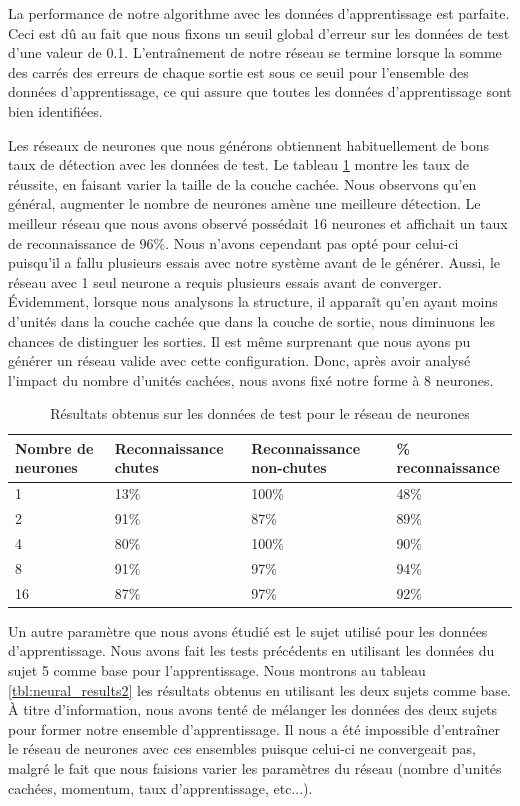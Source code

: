 \documentclass[12pt,letterpaper]{article}
\begin{document}
La performance de notre algorithme avec les données d'apprentissage est parfaite. Ceci est dû au fait que nous fixons un seuil global d'erreur sur les données de test d'une valeur de 0.1. L'entraînement de notre réseau se termine lorsque la somme des carrés des erreurs de chaque sortie est sous ce seuil pour l'ensemble des données d'apprentissage, ce qui assure que toutes les données d'apprentissage sont bien identifiées.

Les réseaux de neurones que nous générons obtiennent habituellement de bons taux de détection avec les données de test. Le tableau \ref{tbl:neural_results} montre les taux de réussite, en faisant varier la taille de la couche cachée. Nous observons qu'en général, augmenter le nombre de neurones amène une meilleure détection. Le meilleur réseau que nous avons observé possédait 16 neurones et affichait un taux de reconnaissance de 96\%. Nous n'avons cependant pas opté pour celui-ci puisqu'il a fallu plusieurs essais avec notre système avant de le générer. Aussi, le réseau avec 1 seul neurone a requis plusieurs essais avant de converger. Évidemment, lorsque nous analysons la structure, il apparaît qu'en ayant moins d'unités dans la couche cachée que dans la couche de sortie, nous diminuons les chances de distinguer les sorties. Il est même surprenant que nous ayons pu générer un réseau valide avec cette configuration. Donc, après avoir analysé l'impact du nombre d'unités cachées, nous avons fixé notre forme à 8 neurones.
\begin{table}
\centering
\begin{tabular}{|p{1.2in}|p{1.3in}|p{1.3in}|l|}
    \hline
    \bf{Nombre de neurones} & \bf{Reconnaissance chutes} & \bf{Reconnaissance non-chutes} & \bf{\% reconnaissance} \\ \hline
    1 & 13\% & 100\% & 48\%  \\ \hline
    2 & 91\%  & 87\% & 89\% \\ \hline
    4 & 80\% & 100\% & 90\% \\ \hline
    8 & 91\% & 97\% & 94\% \\ \hline
    16 & 87\% & 97\% & 92\% \\ \hline
\end{tabular}
\caption{Résultats obtenus sur les données de test pour le réseau de neurones}
\label{tbl:neural_results}
\end{table}

Un autre paramètre que nous avons étudié est le sujet utilisé pour les données d'apprentissage. Nous avons fait les tests précédents en utilisant les données du sujet 5 comme base pour l'apprentissage. Nous montrons au tableau \ref{tbl:neural_results2} les résultats obtenus en utilisant les deux sujets comme base. À titre d'information, nous avons tenté de mélanger les données des deux sujets pour former notre ensemble d'apprentissage. Il nous a été impossible d'entraîner le réseau de neurones avec ces ensembles puisque celui-ci ne convergeait pas, malgré le fait que nous faisions varier les paramètres du réseau (nombre d'unités cachées, momentum, taux d'apprentissage, etc...).
\end{document}
